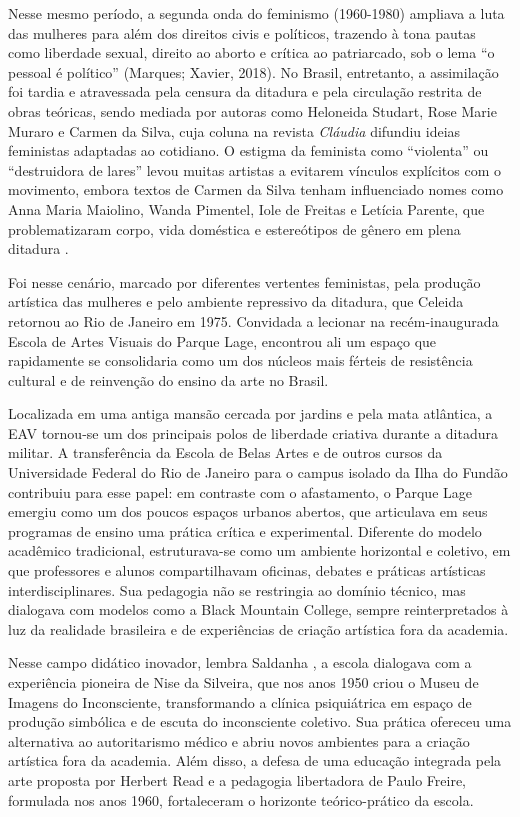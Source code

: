 Nesse mesmo período, a segunda onda do feminismo (1960-1980) ampliava a luta das mulheres para além dos direitos civis e políticos, trazendo à tona pautas como liberdade sexual, direito ao aborto e crítica ao patriarcado, sob o lema “o pessoal é político” (Marques; Xavier, 2018). No Brasil, entretanto, a assimilação foi tardia e atravessada pela censura da ditadura e pela circulação restrita de obras teóricas, sendo mediada por autoras como Heloneida Studart, Rose Marie Muraro e Carmen da Silva, cuja coluna na revista \emph{Cláudia} difundiu ideias feministas adaptadas ao cotidiano. O estigma da feminista como “violenta” ou “destruidora de lares” levou muitas artistas a evitarem vínculos explícitos com o movimento, embora textos de Carmen da Silva tenham influenciado nomes como Anna Maria Maiolino, Wanda Pimentel, Iole de Freitas e Letícia Parente, que problematizaram corpo, vida doméstica e estereótipos de gênero em plena ditadura \parencite{trizoliCriticaArteFeminismo2012}.

Foi nesse cenário, marcado por diferentes vertentes feministas, pela produção artística das mulheres e pelo ambiente repressivo da ditadura, que Celeida retornou ao Rio de Janeiro em 1975. Convidada a lecionar na recém-inaugurada Escola de Artes Visuais do Parque Lage, encontrou ali um espaço que rapidamente se consolidaria como um dos núcleos mais férteis de resistência cultural e de reinvenção do ensino da arte no Brasil.

Localizada em uma antiga mansão cercada por jardins e pela mata atlântica, a EAV tornou-se um dos principais polos de liberdade criativa durante a ditadura militar. A transferência da Escola de Belas Artes e de outros cursos da Universidade Federal do Rio de Janeiro para o campus isolado da Ilha do Fundão contribuiu para esse papel: em contraste com o afastamento, o Parque Lage emergiu como um dos poucos espaços urbanos abertos, que articulava em seus programas de ensino uma prática crítica e experimental. Diferente do modelo acadêmico tradicional, estruturava-se como um ambiente horizontal e coletivo, em que professores e alunos compartilhavam oficinas, debates e práticas artísticas interdisciplinares. Sua pedagogia não se restringia ao domínio técnico, mas dialogava com modelos como a Black Mountain College, sempre reinterpretados à luz da realidade brasileira e de experiências de criação artística fora da academia.

Nesse campo didático inovador, lembra Saldanha \citeyear{saldanhaEscolaArtesVisuais2017}, a escola dialogava com a experiência pioneira de Nise da Silveira, que nos anos 1950 criou o Museu de Imagens do Inconsciente, transformando a clínica psiquiátrica em espaço de produção simbólica e de escuta do inconsciente coletivo. Sua prática ofereceu uma alternativa ao autoritarismo médico e abriu novos ambientes para a criação artística fora da academia. Além disso, a defesa de uma educação integrada pela arte proposta por Herbert Read e a pedagogia libertadora de Paulo Freire, formulada nos anos 1960, fortaleceram o horizonte teórico-prático da escola.

